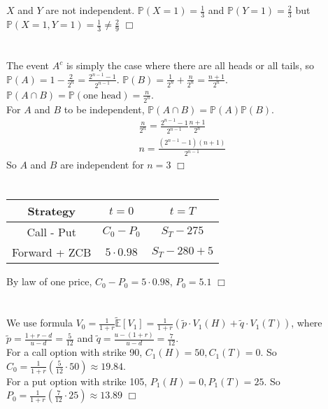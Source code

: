 \documentclass{article}
\begin{document}
\subsection{}
$X$ and $Y$ are not independent. $\mathbb{P}(X = 1) = \tfrac{1}{3}$ and $\mathbb{P}(Y = 1) = \tfrac{2}{3}$ but $\mathbb{P}(X = 1, Y = 1) = \tfrac{1}{3} \neq \tfrac{2}{9}$ $\Box$

\section{}
The event $A^c$ is simply the case where there are all heads or all tails, so $\mathbb{P}(A) = 1 - \frac{2}{2^n} = \frac{2^{n-1} - 1}{2^{n-1}}$. $\mathbb{P}(B) = \frac{1}{2^n} + \frac{n}{2^n} = \frac{n+1}{2^n}$. $\mathbb{P}(A \cap B) = \mathbb{P}(\text{one head}) = \frac{n}{2^n}$.\\
For $A$ and $B$ to be independent, $\mathbb{P}(A \cap B) = \mathbb{P}(A)\mathbb{P}(B)$.
\begin{gather*}
\frac{n}{2^n} = \frac{2^{n-1} - 1}{2^{n-1}} \frac{n+1}{2^n}\\
n = \frac{(2^{n-1} -1)(n+1)}{2^{n-1}}
\end{gather*}
So $A$ and $B$ are independent for $n = 3$ $\Box$

\section{}
\begin{center}
\begin{tabular}{|c|c|c|}
\hline
Strategy & $t = 0$ & $t = T$\\
\hline\hline
Call - Put & $C_0 - P_0$ & $S_T - 275$\\
\hline
Forward + ZCB & $5 \cdot 0.98$ & $S_T - 280 + 5$\\
\hline
\end{tabular}
\end{center}
By law of one price, $C_0 - P_0 = 5\cdot0.98$, $P_0 = 5.1$ $\Box$

\section{}
We use formula $V_0 = \frac{1}{1+r} \widetilde{\mathbb{E}}[V_1] = \frac{1}{1+r} \left( \tilde{p} \cdot V_1(H) + \tilde{q} \cdot V_1(T) \right)$, where $\tilde{p} = \frac{1+r - d}{u-d} = \frac{5}{12}$ and $\tilde{q} = \frac{u - (1+r)}{u-d} = \frac{7}{12}$.\\
For a call option with strike 90, $C_1(H) = 50, C_1(T) = 0$. So $C_0 = \frac{1}{1+r}(\frac{5}{12} \cdot 50) \approx 19.84$.\\
For a put option with strike 105, $P_1(H) = 0, P_1(T) = 25$. So $P_0 = \frac{1}{1+r}(\frac{7}{12} \cdot 25) \approx 13.89$ $\Box$
\end{document}
